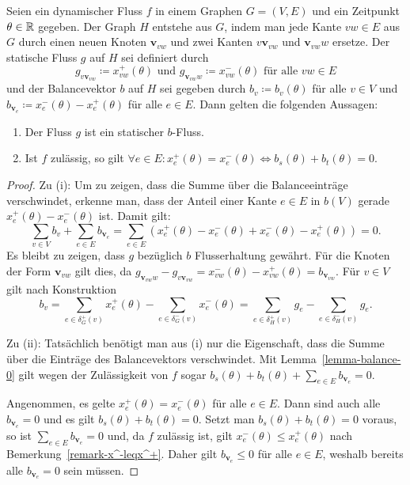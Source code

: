 \newcommand{\newv}{\mathbf{v}}
\begin{lemma}\label{lemma-b-graph}
	Seien ein dynamischer Fluss $f$ in einem Graphen $G=(V,E)$ und ein Zeitpunkt $\theta\in\mathbb{R}$ gegeben.
	Der Graph $H$ entstehe aus $G$, indem man jede Kante $vw\in E$ aus $G$ durch einen neuen Knoten $\newv_{vw}$ und zwei Kanten $v\newv_{vw}$ und $\newv_{vw}w$ ersetze.
	Der statische Fluss $g$ auf $H$ sei definiert durch
	\[ g_{v\newv_{vw}} \coloneq x_{vw}^+(\theta) \text{ und } g_{\newv_{vw}w} \coloneq x_{vw}^-(\theta) \text{ für alle $vw\in E$} \]
	und der Balancevektor $b$ auf $H$ sei gegeben durch $b_v\coloneq b_v(\theta)$ für alle $v\in V$ und $b_{\newv_e}\coloneq x_e^-(\theta) - x_e^+(\theta)$ für alle $e\in E$.
	Dann gelten die folgenden Aussagen:
	
	\begin{enumerate}[label=(\roman*)]
		\item Der Fluss $g$ ist ein statischer $b$-Fluss.
		\item\label{lemma-b-graph-imp} Ist $f$ zulässig, so gilt $\forall e\in E : x_e^+(\theta) = x_e^-(\theta)\iff b_s(\theta) + b_t(\theta) = 0$.
	\end{enumerate}
\end{lemma} 
\begin{proof}
	Zu (i): Um zu zeigen, dass die Summe über die Balanceeinträge verschwindet, erkenne man, dass der Anteil einer Kante $e\in E$ in $b(V)$ gerade $x_e^+(\theta) - x_e^-(\theta)$ ist.
	Damit gilt:
		\[ \sum_{v\in V}b_v + \sum_{e\in E} b_{\newv_e} = \sum_{e\in E} (x_e^+(\theta) - x_e^-(\theta) + x_e^-(\theta) - x_e^+(\theta)) = 0. \]
		Es bleibt zu zeigen, dass $g$ bezüglich $b$ Flusserhaltung gewährt.
		Für die Knoten der Form $\newv_{vw}$ gilt dies, da $g_{\newv_{vw}w} - g_{v\newv_{vw}} = x_{vw}^-(\theta) - x_{vw}^+(\theta) = b_{\newv_{vw}}$.
		Für $v\in V$ gilt nach Konstruktion
		\[ b_v =
		\sum_{e\in\delta^+_G(v)} x_{e}^+(\theta) - \sum_{e\in\delta^-_G(v)} x_{e}^-(\theta) =
	\sum_{e\in\delta_H^+(v)} g_e - \sum_{e\in\delta^-_H(v)}g_e
		. \]
	
	Zu (ii): Tatsächlich benötigt man aus (i) nur die Eigenschaft, dass die Summe über die Einträge des Balancevektors verschwindet.
	Mit Lemma~\ref{lemma-balance-0} gilt wegen der Zulässigkeit von $f$ sogar $b_s(\theta)+b_t(\theta) + \sum_{e\in E} b_{\newv_e} = 0$.
	
	Angenommen, es gelte $x_e^+(\theta) = x_e^-(\theta)$ für alle $e\in E$.
	Dann sind auch alle $b_{\newv_e} = 0$ und es gilt $b_s(\theta) + b_t(\theta) = 0$.
	Setzt man $b_s(\theta) + b_t(\theta) = 0$ voraus, so ist $\sum_{e\in E} b_{\newv_e} = 0$ und, da $f$ zulässig ist, gilt $x_e^-(\theta)\leq x_e^+(\theta)$ nach Bemerkung~\ref{remark-x^-leqx^+}.
	Daher gilt $b_{\newv_e}\leq 0$ für alle $e\in E$, weshalb bereits alle $b_{\newv_e} = 0$ sein müssen.
\end{proof}

